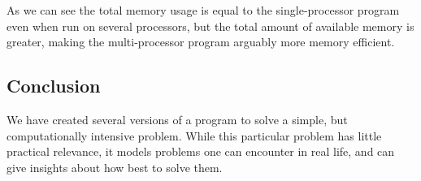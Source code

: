 \documentclass[a4paper, 12pt]{article}
\begin{document}
    As we can see the total memory usage is equal to the single-processor program even when run on several processors, but the total amount of available memory is greater, making the multi-processor program arguably more memory efficient.

    \subsection{Conclusion}
    We have created several versions of a program to solve a simple, but computationally intensive problem. While this particular problem has little practical relevance, it models problems one can encounter in real life, and can give insights about how best to solve them.
\end{document}
